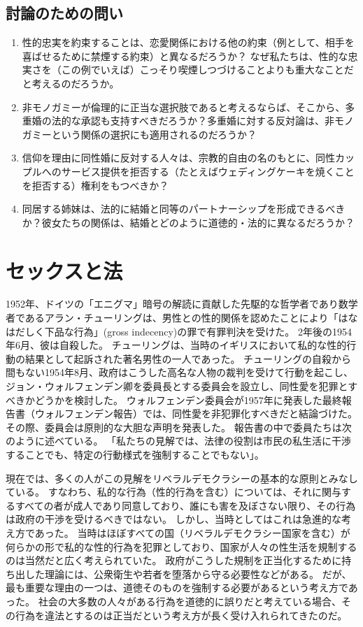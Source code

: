 \documentclass[paper=a4,book,openany]{jlreq} \usepackage{mystyle}
\begin{document}
\section{討論のための問い}

\begin{enumerate}
\item 性的忠実を約束することは、恋愛関係における他の約束（例として、相手を喜ばせるために禁煙する約束）と異なるだろうか？ なぜ私たちは、性的な忠実さを（この例でいえば）こっそり喫煙しつづけることよりも重大なことだと考えるのだろうか。
\item 非モノガミーが倫理的に正当な選択肢であると考えるならば、そこから、多重婚の法的な承認も支持すべきだろうか？多重婚に対する反対論は、非モノガミーという関係の選択にも適用されるのだろうか？

\item 信仰を理由に同性婚に反対する人々は、宗教的自由の名のもとに、同性カップルへのサービス提供を拒否する（たとえばウェディングケーキを焼くことを拒否する）権利をもつべきか？
\item 同居する姉妹は、法的に結婚と同等のパートナーシップを形成できるべきか？彼女たちの関係は、結婚とどのように道徳的・法的に異なるだろうか？
\end{enumerate}

\chapter{セックスと法}

1952年、ドイツの「エニグマ」暗号の解読に貢献した先駆的な哲学者であり数学者であるアラン・チューリングは、男性との性的関係を認めたことにより「はなはだしく下品な行為」(gross indecency)の罪で有罪判決を受けた。
2年後の1954年6月、彼は自殺した。
チューリングは、当時のイギリスにおいて私的な性的行動の結果として起訴された著名男性の一人であった。
チューリングの自殺から間もない1954年8月、政府はこうした高名な人物の裁判を受けて行動を起こし、ジョン・ウォルフェンデン卿を委員長とする委員会を設立し、同性愛を犯罪とすべきかどうかを検討した。
ウォルフェンデン委員会が1957年に発表した最終報告書（ウォルフェンデン報告）では、同性愛を非犯罪化すべきだと結論づけた。
その際、委員会は原則的な大胆な声明を発表した。
報告書の中で委員たちは次のように述べている。
「私たちの見解では、法律の役割は市民の私生活に干渉することでも、特定の行動様式を強制することでもない」\citep{wollfenden57:_repor_commit_homos_offen_prost}。

現在では、多くの人がこの見解をリベラルデモクラシーの基本的な原則とみなしている。
すなわち、私的な行為（性的行為を含む）については、それに関与するすべての者が成人であり同意しており、誰にも害を及ぼさない限り、その行為は政府の干渉を受けるべきではない。
しかし、当時としてはこれは急進的な考え方であった。
当時はほぼすべての国（リベラルデモクラシー国家を含む）が何らかの形で私的な性的行為を犯罪としており、国家が人々の性生活を規制するのは当然だと広く考えられていた。
政府がこうした規制を正当化するために持ち出した理論には、公衆衛生や若者を堕落から守る必要性などがある。
だが、最も重要な理由の一つは、道徳そのものを強制する必要があるという考え方であった。
社会の大多数の人々がある行為を道徳的に誤りだと考えている場合、その行為を違法とするのは正当だという考え方が長く受け入れられてきたのだ。
\end{document}

